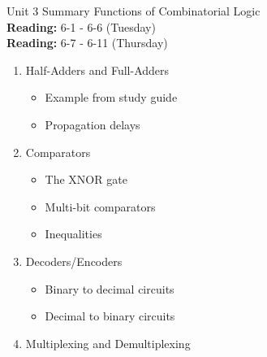 \documentclass{beamer}
\begin{document}
\begin{frame}{Unit 3 Summary}
\alert{Functions of Combinatorial Logic} \\
\textbf{Reading:} 6-1 - 6-6 (Tuesday) \\
\textbf{Reading:} 6-7 - 6-11 (Thursday)
\begin{enumerate}
\item Half-Adders and Full-Adders
\begin{itemize}
\item Example from study guide
\item Propagation delays
\end{itemize}
\item Comparators
\begin{itemize}
\item The XNOR gate
\item Multi-bit comparators
\item Inequalities
\end{itemize}
\item Decoders/Encoders
\begin{itemize}
\item Binary to decimal circuits
\item Decimal to binary circuits
\end{itemize}
\item Multiplexing and Demultiplexing
\end{enumerate}
\end{frame}
\end{document}
